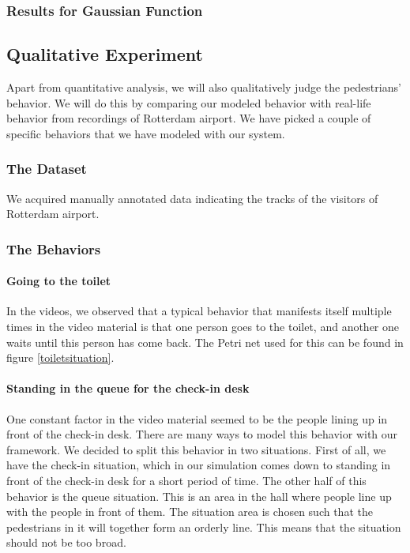 \documentclass[11pt]{article}
\begin{document}
\subsubsection{Results for Gaussian Function}



\subsection{Qualitative Experiment}
Apart from quantitative analysis, we will also qualitatively judge the pedestrians' behavior. We will do this by comparing our modeled behavior with real-life behavior from recordings of Rotterdam airport. We have picked a couple of specific behaviors that we have modeled with our system.

\subsubsection{The Dataset}
We acquired manually annotated data indicating the tracks of the visitors of Rotterdam airport. 

\subsubsection{The Behaviors}

\paragraph{Going to the toilet}
In the videos, we observed that a typical behavior that manifests itself multiple times in the video material is that one person goes to the toilet, and another one waits until this person has come back. The Petri net used for this can be found in figure \ref{toiletsituation}.

\paragraph{Standing in the queue for the check-in desk}
One constant factor in the video material seemed to be the people lining up in front of the check-in desk. There are many ways to model this behavior with our framework.
We decided to split this behavior in two situations. First of all, we have the check-in situation, which in our simulation comes down to standing in front of the check-in desk for a short period of time. The other half of this behavior is the queue situation. This is an area in the hall where people line up with the people in front of them. The situation area is chosen such that the pedestrians in it will together form an orderly line. This means that the situation should not be too broad.
\end{document}
